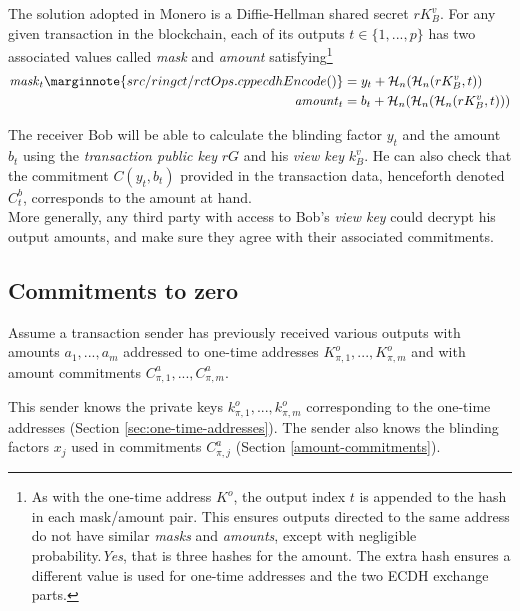 The solution adopted in Monero is a Diffie-Hellman shared secret $r K_B^v$. For any given transaction in the blockchain, each of its outputs $t \in \{1, ..., p\}$ has two associated values called {\em mask} and {\em amount}  satisfying\footnote{As with the one-time address $K^o$, the output index $t$ is appended to the hash in each mask/amount pair. This ensures outputs directed to the same address do not have similar {\em masks} and {\em amounts}, except with negligible probability.{\em Yes}, that is three hashes for the amount. The extra hash ensures a different value is used for one-time addresses and the two ECDH exchange parts.}%
\begin{align*}
  \mathit{mask}_t\marginnote{src/ringct/ rctOps.cpp ecdhEncode()}     &= y_t + \mathcal{H}_n(\mathcal{H}_n(r K_B^v, t)) \\
  \mathit{amount}_t   &= b_t + \mathcal{H}_n(\mathcal{H}_n(\mathcal{H}_n(r K_B^v, t)))
\end{align*}

The receiver Bob will be able to calculate the blinding factor $y_t$ and the amount $b_t$ using the {\em transaction public key} $r G$ and his {\em view key} $k_B^v$. He can also check that the commitment $C(y_t, b_t)$ provided in the transaction data, henceforth denoted $C_t^b$,  corresponds to the amount at hand.\\

More generally, any third party with access to Bob’s {\em view key} could decrypt his output amounts, and make sure they agree with their associated commitments.



\subsection{Commitments to zero}
\label{sec:commitments-to-zero}

Assume a transaction sender has previously received various outputs with amounts $a_1, ..., a_m$ addressed to one-time addresses $K_{\pi,1}^o, ..., K_{\pi,m}^o$ and with amount commitments $C_{\pi,1}^a, ..., C_{\pi,m}^a$.

This sender knows the private keys $k_{\pi,1}^o, ..., k_{\pi,m}^o$ corresponding to the one-time addresses (Section \ref{sec:one-time-addresses}). The sender also knows the blinding factors $x_j$ used in commitments $C_{\pi,j}^a$ (Section \ref{amount-commitments}).

